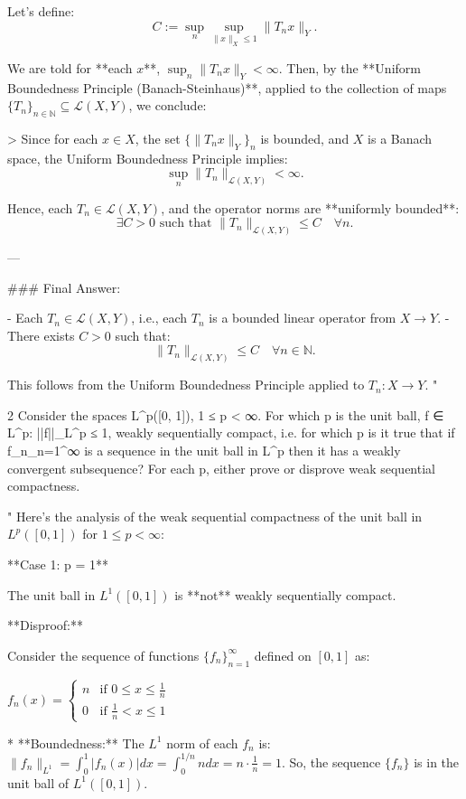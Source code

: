 Let’s define:
\[
C := \sup_{n} \sup_{\|x\|_X \leq 1} \|T_n x\|_Y.
\]

We are told for **each \( x \)**, \( \sup_n \|T_n x\|_Y < \infty \). Then, by the **Uniform Boundedness Principle (Banach-Steinhaus)**, applied to the collection of maps \( \{T_n\}_{n \in \mathbb{N}} \subseteq \mathcal{L}(X, Y) \), we conclude:

> Since for each \( x \in X \), the set \( \{\|T_n x\|_Y\}_{n} \) is bounded, and \( X \) is a Banach space, the Uniform Boundedness Principle implies:
\[
\sup_{n} \|T_n\|_{\mathcal{L}(X, Y)} < \infty.
\]

Hence, each \( T_n \in \mathcal{L}(X, Y) \), and the operator norms are **uniformly bounded**:
\[
\exists C > 0 \text{ such that } \|T_n\|_{\mathcal{L}(X, Y)} \leq C \quad \forall n.
\]

---

### Final Answer:

- Each \( T_n \in \mathcal{L}(X, Y) \), i.e., each \( T_n \) is a bounded linear operator from \( X \to Y \).
- There exists \( C > 0 \) such that:
  \[
  \|T_n\|_{\mathcal{L}(X, Y)} \leq C \quad \forall n \in \mathbb{N}.
  \]

This follows from the Uniform Boundedness Principle applied to \( T_n: X \to Y \).
"

2 Consider the spaces L^p([0, 1]), 1 ≤ p < ∞. For which p is the unit ball, {f ∈ L^p: ||f||_{L^p} ≤ 1}, weakly sequentially compact, i.e. for which p is it true that if {f_n}_{n=1}^∞ is a sequence in the unit ball in L^p then it has a weakly convergent subsequence? For each p, either prove or disprove weak sequential compactness.

"
Here's the analysis of the weak sequential compactness of the unit ball in $L^p([0, 1])$ for $1 \le p < \infty$:

**Case 1: p = 1**

The unit ball in $L^1([0, 1])$ is **not** weakly sequentially compact.

**Disproof:**

Consider the sequence of functions $\{f_n\}_{n=1}^\infty$ defined on $[0, 1]$ as:

$f_n(x) = \begin{cases}
n & \text{if } 0 \le x \le \frac{1}{n} \\
0 & \text{if } \frac{1}{n} < x \le 1
\end{cases}$

* **Boundedness:** The $L^1$ norm of each $f_n$ is:
    $\|f_n\|_{L^1} = \int_0^1 |f_n(x)| dx = \int_0^{1/n} n dx = n \cdot \frac{1}{n} = 1$.
    So, the sequence $\{f_n\}$ is in the unit ball of $L^1([0, 1])$.

